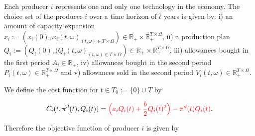 \documentclass[11pt, letterpaper]{article}
\newcommand{\seba}{\textcolor[rgb]{0,1,1}}
\begin{document}
Each producer $i$ represents one and only one technology in the economy. The choice set of the producer $i$ over a time horizon of $\bar{t}$ years is given by: i) an amount of capacity expansion $x_i:=\left(x_i(0),x_i(t,\omega)_{(t,\omega)\in T\times\Omega}\right)\in\mathbb{R}_+\times\mathbb{R}_+^{T\times\Omega}$, ii) a production plan $Q_i:=\left(Q_{i}(0),(Q_{i}(t,\omega)_{(t,\omega)\in T\times\Omega}\right)\in\mathbb{R}_+\times\mathbb{R}_+^{T\times\Omega}$, iii) allowances bought in the first period $A_i\in\mathbb{R}_+$, iv) allowances bought in the second period $P_i(t,\omega)\in\mathbb{R}_+^{T\times\Omega}$ and v) allowances sold in the second period $V_i(t,\omega)\in\mathbb{R}_+^{T\times\Omega}$.

We define the cost function for $t\in T_0:=\{0\}\cup T$ by

$$C_i(t,\pi^{d}(t),Q_i(t))={\color{red}\Big(a_iQ_i(t)+\frac{b}{2}Q_i(t)^{2}\Big)-\pi^{d}(t) Q_i(t)}.$$





Therefore the objective function of producer $i$ is given by
\end{document}
